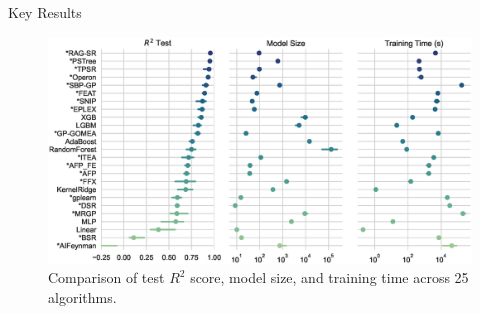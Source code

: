 \documentclass[final]{beamer}
\newlength{\onecolwid}
\begin{document}
\begin{frame}[t]
\begin{columns}[t]
\begin{column}{\onecolwid}
\begin{block}{Key Results}
                    \begin{figure}
                        \centering
                        \includegraphics[width=\linewidth, trim=5 5 5 5, clip]{figs/pairgrid-pointplot_r2_test_model_size_training-time-(s).eps}
                        \caption{Comparison of test $R^2$ score, model size, and training time across 25 algorithms.}
                    \end{figure}



\end{block}
\end{column}
\end{columns}
\end{frame}
\end{document}

